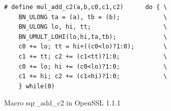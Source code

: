 \begin{figure}
    \centering
    \begin{lstlisting}[xleftmargin=.02\textwidth,xrightmargin=.01\textwidth]
# define mul_add_c2(a,b,c0,c1,c2)      do { \
    BN_ULONG ta = (a), tb = (b);            \
    BN_ULONG lo, hi, tt;                    \
    BN_UMULT_LOHI(lo,hi,ta,tb);             \
    c0 += lo; tt = hi+((c0<lo)?1:0);        \
    c1 += tt; c2 += (c1<tt)?1:0;            \
    c0 += lo; hi += (c0<lo)?1:0;            \
    c1 += hi; c2 += (c1<hi)?1:0;            \
    } while(0)
\end{lstlisting}
    \vspace*{-6pt}
    \caption{Macro \textsf{sqr\_add\_c2} in OpenSSL 1.1.1}
    \label{fig:new_sqr2}
    \vspace*{-6pt}
\end{figure}




